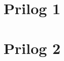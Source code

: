 \documentclass[]{foi}
\begin{document}
\lipsum[1-2]

\makebackmatter

\appendices %

\chapter{Prilog 1} %

\chapter{Prilog 2} %
\end{document}
